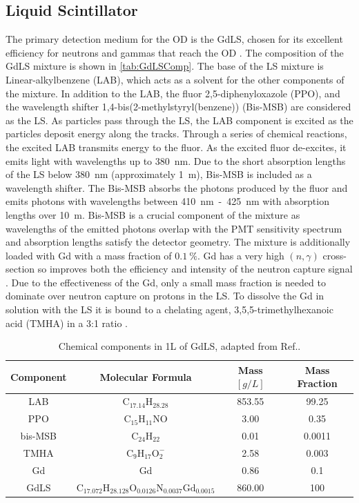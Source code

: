 \subsection{Liquid Scintillator}
The primary detection medium for the OD is the GdLS, chosen for its excellent efficiency for neutrons and gammas that reach the OD \cite{LZTDR}. The composition of the GdLS mixture is shown in \autoref{tab:GdLSComp}. The base of the LS mixture is Linear-alkylbenzene (LAB), which acts as a solvent for the other components of the mixture. In addition to the LAB, the fluor 2,5-diphenyloxazole (PPO), and the wavelength shifter 1,4-bis(2-methylstyryl(benzene)) (Bis-MSB) are considered as the LS. As particles pass through the LS, the LAB component is excited as the particles deposit energy along the tracks. Through a series of chemical reactions, the excited LAB transmits energy to the fluor. As the excited fluor de-excites, it emits light with wavelengths up to 380~nm. Due to the short absorption lengths of the LS below 380~nm (approximately 1~m), Bis-MSB is included as a wavelength shifter. The Bis-MSB absorbs the photons produced by the fluor and emits photons with wavelengths between 410~nm~-~425~nm with absorption lengths over 10~m. Bis-MSB is a crucial component of the mixture as wavelengths of the emitted photons overlap with the PMT sensitivity spectrum and absorption lengths satisfy the detector geometry.
The mixture is additionally loaded with Gd with a mass fraction of $0.1~\%$. Gd has a very high $(n,\gamma)$ cross-section so improves both the efficiency and intensity of the neutron capture signal \cite{LZTDR}. Due to the effectiveness of the Gd, only a small mass fraction is needed to dominate over neutron capture on protons in the LS. To dissolve the Gd in solution with the LS it is bound to a chelating agent, 3,5,5-trimethylhexanoic acid (TMHA) in a 3:1 ratio \cite{LZTDR,Haselschwardt:2018vmp}.
\begin{table}
    \centering
    \begin{tabular}{cccc}
        \hline
        \textbf{Component} & \textbf{Molecular Formula} & \textbf{Mass $[g/L]$} & \textbf{Mass Fraction} \\
        \hline
        LAB & $\text{C}_{17.14}\text{H}_{28.28}$ & 853.55 & 99.25\\
        PPO & $\text{C}_{15}\text{H}_{11}\text{NO}$ & 3.00 & 0.35 \\
        bis-MSB & $\text{C}_{24}\text{H}_{22}$ & 0.01 & 0.0011\\
        TMHA & $\text{C}_{9}\text{H}_{17}\text{O}_{2}^{-}$ & 2.58 & 0.003\\
        Gd & Gd & 0.86 & 0.1 \\
        \hline
        GdLS & $\text{C}_{17.072} \text{H}_{28.128} \text{O}_{0.0126} \text{N}_{0.0037} \text{Gd}_{0.0015}$ & 860.00 & 100 \\
        \hline
    \end{tabular}
    \caption{Chemical components in 1L of GdLS, adapted from Ref.\cite{Haselschwardt:2018vmp}.}
    \label{tab:GdLSComp}
\end{table}
